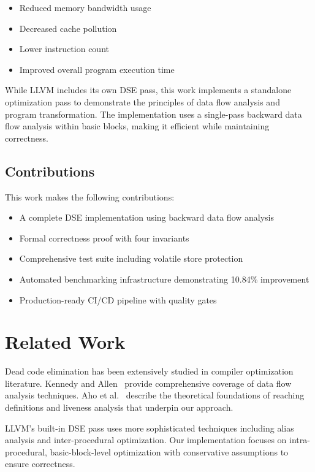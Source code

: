 \documentclass[journal]{IEEEtran}
\begin{document}
\begin{itemize}
\item Reduced memory bandwidth usage
\item Decreased cache pollution
\item Lower instruction count
\item Improved overall program execution time
\end{itemize}

While LLVM includes its own DSE pass, this work implements a standalone optimization pass to demonstrate the principles of data flow analysis and program transformation. The implementation uses a single-pass backward data flow analysis within basic blocks, making it efficient while maintaining correctness.

\subsection{Contributions}

This work makes the following contributions:
\begin{itemize}
\item A complete DSE implementation using backward data flow analysis
\item Formal correctness proof with four invariants
\item Comprehensive test suite including volatile store protection
\item Automated benchmarking infrastructure demonstrating 10.84\% improvement
\item Production-ready CI/CD pipeline with quality gates
\end{itemize}

\section{Related Work}

Dead code elimination has been extensively studied in compiler optimization literature. Kennedy and Allen~\cite{kennedy2002optimizing} provide comprehensive coverage of data flow analysis techniques. Aho et al.~\cite{aho2006compilers} describe the theoretical foundations of reaching definitions and liveness analysis that underpin our approach.

LLVM's built-in DSE pass uses more sophisticated techniques including alias analysis and inter-procedural optimization. Our implementation focuses on intra-procedural, basic-block-level optimization with conservative assumptions to ensure correctness.
\end{document}
